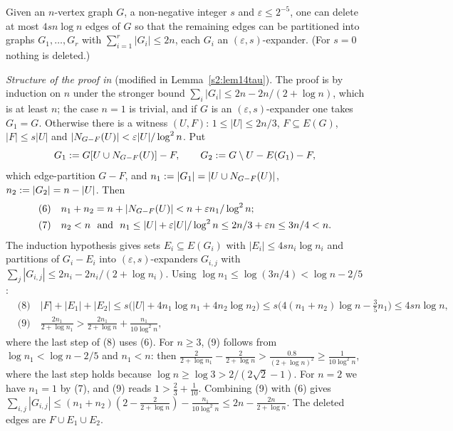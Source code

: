 \begin{citedresult}[{\cite[Lemma~14]{BM}}]\label{s1:citLem14}
Given an $n$-vertex graph $G$, a non-negative integer $s$ and
$\varepsilon\le2^{-5}$, one can delete at most $4sn\log n$ edges of $G$ so that
the remaining edges can be partitioned into graphs $G_1,\dots,G_r$ with
$\sum_{i=1}^r|G_i|\le2n$, each $G_i$ an $(\varepsilon,s)$-expander. (For $s=0$
nothing is deleted.)

\emph{Structure of the proof in \cite{BM}} (modified in
Lemma~\ref{s2:lem14tau}). The proof is by induction on $n$ under the stronger
bound $\sum_i|G_i|\le2n-2n/(2+\log n)$, which is at least $n$; the case $n=1$ is
trivial, and if $G$ is an $(\varepsilon,s)$-expander one takes $G_1=G$.
Otherwise there is a witness $(U,F)$: $1\le|U|\le2n/3$, $F\subseteq E(G)$,
$|F|\le s|U|$ and $|N_{G-F}(U)|<\varepsilon|U|/\log^2n$. Put
\[
G_1\mathrel{:=} G[U\cup N_{G-F}(U)]-F,\qquad
G_2\mathrel{:=} G\setminus U-E(G_1)-F,
\]
which edge-partition $G-F$, and $n_1\mathrel{:=}|G_1|=|U\cup N_{G-F}(U)|$,
$n_2\mathrel{:=}|G_2|=n-|U|$. Then
\begin{align*}
&\text{(6)}\quad n_1+n_2=n+|\Nbr_{G-F}(U)|<n+\varepsilon n_1/\log^2n;\\
&\text{(7)}\quad n_2<n\ \text{ and }\ n_1\le|U|+\varepsilon|U|/\log^2n\le
2n/3+\varepsilon n\le3n/4<n.
\end{align*}
The induction hypothesis gives sets $E_i\subseteq E(G_i)$ with $|E_i|\le4sn_i\log
n_i$ and partitions of $G_i-E_i$ into $(\varepsilon,s)$-expanders $G_{i,j}$ with
$\sum_j|G_{i,j}|\le2n_i-2n_i/(2+\log n_i)$. Using $\log n_1\le\log(3n/4)<\log
n-2/5$:
\begin{align*}
&\text{(8)}\quad |F|+|E_1|+|E_2|\le s\bigl(|U|+4n_1\log n_1+4n_2\log n_2\bigr)
\le s\bigl(4(n_1+n_2)\log n-\tfrac35n_1\bigr)\le4sn\log n,\\
&\text{(9)}\quad \frac{2n_1}{2+\log n_1}>\frac{2n_1}{2+\log
n}+\frac{n_1}{10\log^2n},
\end{align*}
where the last step of (8) uses (6). For $n\ge3$, (9) follows from $\log
n_1<\log n-2/5$ and $n_1<n$: then $\frac2{2+\log n_1}-\frac2{2+\log
n}>\frac{0.8}{(2+\log n)^2}\ge\frac1{10\log^2n}$, where the last step holds
because $\log n\ge\log3>2/(2\sqrt2-1)$. For $n=2$ we have $n_1=1$ by (7), and
(9) reads $1>\frac23+\frac1{10}$. Combining (9) with (6) gives
$\sum_{i,j}|G_{i,j}|\le(n_1+n_2)(2-\frac{2}{2+\log n})-\frac{n_1}{10\log^2n}\le
2n-\frac{2n}{2+\log n}$. The deleted edges are $F\cup E_1\cup E_2$.
\end{citedresult}

